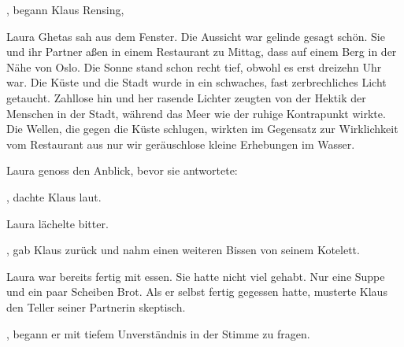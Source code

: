 , begann Klaus Rensing, 

\par

Laura Ghetas sah aus dem Fenster. Die Aussicht war gelinde gesagt schön. Sie und ihr Partner aßen in einem Restaurant zu Mittag, dass auf einem Berg in der Nähe von Oslo. Die Sonne stand schon recht tief, obwohl es erst dreizehn Uhr war. Die Küste und die Stadt wurde in ein schwaches, fast zerbrechliches Licht getaucht. Zahllose hin und her rasende Lichter zeugten von der Hektik der Menschen in der Stadt, während das Meer wie der ruhige Kontrapunkt wirkte. Die Wellen, die gegen die Küste schlugen, wirkten im Gegensatz zur Wirklichkeit vom Restaurant aus nur wir geräuschlose kleine Erhebungen im Wasser.

\par

Laura genoss den Anblick, bevor sie antwortete: 

\par

, dachte Klaus laut. 

\par

Laura lächelte bitter. 

\par

, gab Klaus zurück und nahm einen weiteren Bissen von seinem Kotelett.

\par

Laura war bereits fertig mit essen. Sie hatte nicht viel gehabt. Nur eine Suppe und ein paar Scheiben Brot. Als er selbst fertig gegessen hatte, musterte Klaus den Teller seiner Partnerin skeptisch.

\par

, begann er mit tiefem Unverständnis in der Stimme zu fragen. 

